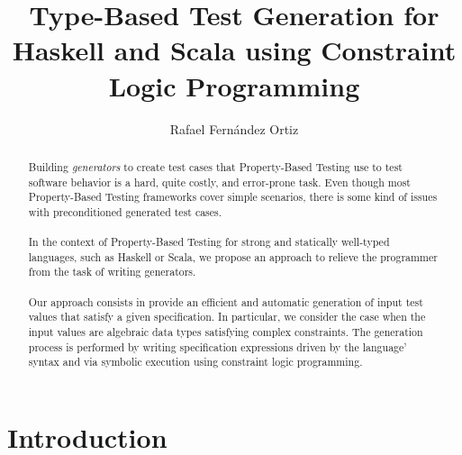 \documentclass{report}
\title{Type-Based Test Generation for Haskell and Scala using Constraint Logic Programming}
\author{Rafael Fernández Ortiz}
\theoremstyle{definition}
\theoremstyle{definition}
\begin{document}
\maketitle
\begin{abstract}
	Building \textit{generators} to create test cases that Property-Based Testing use to test software behavior is a hard, quite costly, and error-prone task. Even though most Property-Based Testing frameworks cover simple scenarios, there is some kind of issues with preconditioned generated test cases.
	\\\\
	In the context of Property-Based Testing for strong and statically well-typed languages, such as Haskell or Scala, we propose an approach to relieve the programmer from the task of writing generators.\\\\
	Our approach consists in provide an efficient and automatic generation of input test values that satisfy a given specification. In particular, we consider the case when the input values are algebraic data types satisfying complex constraints. The generation process is performed by writing specification expressions driven by the language' syntax and via symbolic execution using constraint logic programming.
\end{abstract}
\tableofcontents

\chapter{Introduction}
\end{document}
